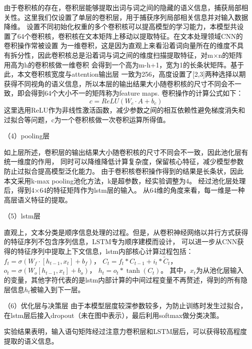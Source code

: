  由于卷积核的存在，卷积层能够提取出词与词之间的隐藏的语义信息，捕获局部相关性。这里我们仅设置了单层的卷积层，用于捕获序列局部相关信息并对输入数据降维。
  设置不同初始化权重的多个卷积核可以提高模型的学习能力，本模型共设置了64个卷积核，卷积核在文本矩阵上移动以提取特征。在文本处理领域CNN的卷积操作常被设置
  为一维卷积，这是因为直观上来看沿着词向量所在的维度不具有拆分性，因此卷积核总是沿着词与词之间的维度扫描提取特征，对m×n的矩阵用高为h的卷积核做一维卷积
  会得到一个高为m-h+1，宽为1的长条状矩阵。基于此，本文卷积核宽度与attention输出层
  一致为256，高度设置了[2,3]两种选择以期获得不同视角的语义信息，所以本层的输出结果大小随卷积核的尺寸不同会不一致，即会得到64个大小不一的矩阵称为feature maps.
  卷积操作的计算公式如下：
  \begin{equation}
    c=ReLU(W_{c} \cdot A+b_{c})
    \end{equation}
    这里选用ReLU作为非线性激活函数，减少参数之间的相互依赖性避免梯度消失和过拟合等问题，c为一个卷积核做一次卷积运算所得值。

   （4）pooling层

    如上层所述，卷积层的输出结果大小随卷积核的尺寸不同会不一致，因此池化层有统一维度的作用，
    同时可以降维降低计算复杂度，保留核心特征，减少模型参数防止过拟合提高模型泛化能力。
    由于卷积核卷积操作得到的结果是长条状，因此本文采用k-max pooling池化方法，k是超参数，经实验调整为4。
    经过池化层处理后，得到4×64的特征矩阵作为lstm层的输入。
    从64维的角度来看，每一维是一种高层语义特征的提取。

    （5）lstm层

  直观上，文本分类是顺序信息处理的过程。但是，从卷积神经网络以并行方式获得的特征序列不包含序列信息，LSTM专为顺序建模而设计，
  可以进一步从CNN获得的特征序列中提取上下文信息，lstm内部核心计算过程包括：$f_{t}=σ(W_{f}\cdot[h_{t-1},x_t]+b_{f})$，
  $C_{t}=f_{t} * C_{t-1}+i_{t} * \tilde{C}_{t}$，$o_{t}=\sigma\left(W_{o}\left[h_{t-1}, x_{t}\right]+b_{o}\right)$，
  $h_{t}=o_{t} * \tanh \left(C_{t}\right)$。
    其中，$x_t$为从池化层输入的变量，其他字符代表的是lstm内部计算的中间过程变量不再赘述，得到的所有隐层信息$h_t$被输入到下一层。
  
    （6）优化层与决策层
    由于本模型层度较深参数较多，为防止训练时发生过拟合，在lstm层后接入dropout（未在图中表示），最后利用softmax做分类决策。

实验结果表明，输入语句矩阵经过注意力卷积层和LSTM层后，可以获得较高程度提取的语义信息。



